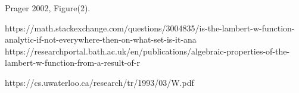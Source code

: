 \documentclass[12pt]{article}
\begin{document}
%
Prager 2002, Figure(2).



https://math.stackexchange.com/questions/3004835/is-the-lambert-w-function-analytic-if-not-everywhere-then-on-what-set-is-it-ana
https://researchportal.bath.ac.uk/en/publications/algebraic-properties-of-the-lambert-w-function-from-a-result-of-r

%
https://cs.uwaterloo.ca/research/tr/1993/03/W.pdf

%
\end{document}
